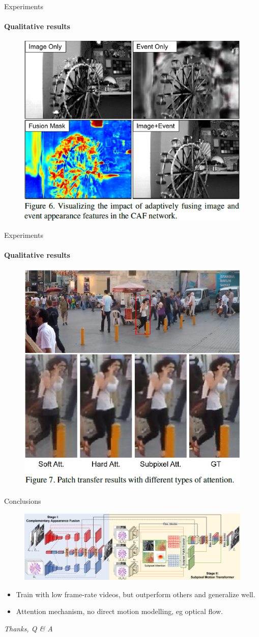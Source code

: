 \documentclass[aspectratio=43]{beamer}
\begin{document}
	\begin{frame}{Experiments}
		\framesubtitle{Qualitative results}
		\begin{figure}
			\centering\includegraphics[width=0.6\linewidth]{images/result4.png}
		\end{figure}
	\end{frame}

	\begin{frame}{Experiments}
		\framesubtitle{Qualitative results}
		\begin{figure}
			\centering\includegraphics[width=0.6\linewidth]{images/result5.png}
		\end{figure}
	\end{frame}

	\begin{frame}{Conclusions}
		\begin{figure}
			\centering\includegraphics[width=0.95\linewidth]{images/overview.png}
		\end{figure}
		\begin{itemize}
			\item Train with low frame-rate videos, but outperform others and generalize well.
			\item Attention mechanism, no direct motion modelling, eg optical flow.
		\end{itemize}
	\end{frame}

	\begin{frame}{}
		\centering \Huge
		\emph{Thanks,  Q \& A }
	\end{frame}
\end{document}
